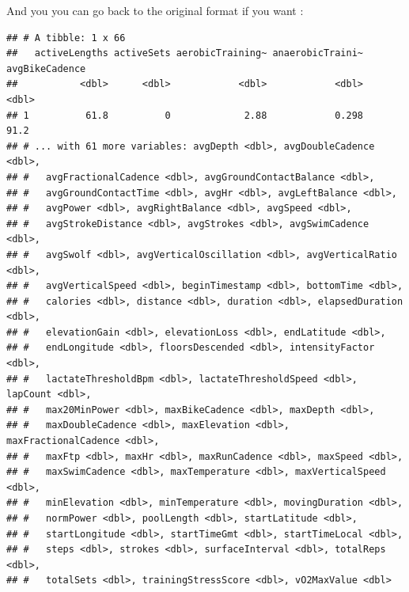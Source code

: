 \documentclass[
]{book}
\newenvironment{Shaded}{\begin{snugshade}}{\end{snugshade}}
\newcommand{\DataTypeTok}[1]{\textcolor[rgb]{0.13,0.29,0.53}{#1}}
\newcommand{\KeywordTok}[1]{\textcolor[rgb]{0.13,0.29,0.53}{\textbf{#1}}}
\newcommand{\NormalTok}[1]{#1}
\newcommand{\OperatorTok}[1]{\textcolor[rgb]{0.81,0.36,0.00}{\textbf{#1}}}
\newcommand{\StringTok}[1]{\textcolor[rgb]{0.31,0.60,0.02}{#1}}
\begin{document}
And you you can go back to the original format if you want :

\begin{Shaded}
\end{Shaded}

\begin{verbatim}
## # A tibble: 1 x 66
##   activeLengths activeSets aerobicTraining~ anaerobicTraini~ avgBikeCadence
##           <dbl>      <dbl>            <dbl>            <dbl>          <dbl>
## 1          61.8          0             2.88            0.298           91.2
## # ... with 61 more variables: avgDepth <dbl>, avgDoubleCadence <dbl>,
## #   avgFractionalCadence <dbl>, avgGroundContactBalance <dbl>,
## #   avgGroundContactTime <dbl>, avgHr <dbl>, avgLeftBalance <dbl>,
## #   avgPower <dbl>, avgRightBalance <dbl>, avgSpeed <dbl>,
## #   avgStrokeDistance <dbl>, avgStrokes <dbl>, avgSwimCadence <dbl>,
## #   avgSwolf <dbl>, avgVerticalOscillation <dbl>, avgVerticalRatio <dbl>,
## #   avgVerticalSpeed <dbl>, beginTimestamp <dbl>, bottomTime <dbl>,
## #   calories <dbl>, distance <dbl>, duration <dbl>, elapsedDuration <dbl>,
## #   elevationGain <dbl>, elevationLoss <dbl>, endLatitude <dbl>,
## #   endLongitude <dbl>, floorsDescended <dbl>, intensityFactor <dbl>,
## #   lactateThresholdBpm <dbl>, lactateThresholdSpeed <dbl>, lapCount <dbl>,
## #   max20MinPower <dbl>, maxBikeCadence <dbl>, maxDepth <dbl>,
## #   maxDoubleCadence <dbl>, maxElevation <dbl>, maxFractionalCadence <dbl>,
## #   maxFtp <dbl>, maxHr <dbl>, maxRunCadence <dbl>, maxSpeed <dbl>,
## #   maxSwimCadence <dbl>, maxTemperature <dbl>, maxVerticalSpeed <dbl>,
## #   minElevation <dbl>, minTemperature <dbl>, movingDuration <dbl>,
## #   normPower <dbl>, poolLength <dbl>, startLatitude <dbl>,
## #   startLongitude <dbl>, startTimeGmt <dbl>, startTimeLocal <dbl>,
## #   steps <dbl>, strokes <dbl>, surfaceInterval <dbl>, totalReps <dbl>,
## #   totalSets <dbl>, trainingStressScore <dbl>, vO2MaxValue <dbl>
\end{verbatim}
\end{document}
